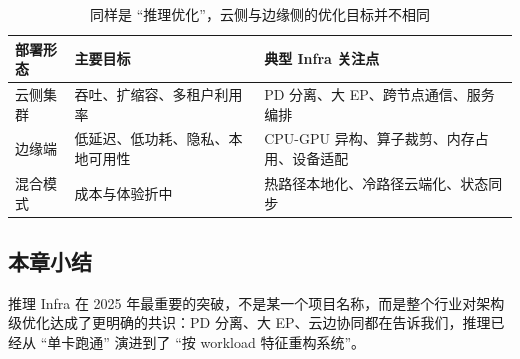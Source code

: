 \begin{table}[H]
\centering
\begin{tabular}{p{2.8cm}p{4.0cm}p{4.5cm}}
\toprule
\textbf{部署形态} & \textbf{主要目标} & \textbf{典型 Infra 关注点} \\
\midrule
云侧集群 & 吞吐、扩缩容、多租户利用率 & PD 分离、大 EP、跨节点通信、服务编排 \\
边缘端 & 低延迟、低功耗、隐私、本地可用性 & CPU-GPU 异构、算子裁剪、内存占用、设备适配 \\
混合模式 & 成本与体验折中 & 热路径本地化、冷路径云端化、状态同步 \\
\bottomrule
\end{tabular}
\caption{同样是 ``推理优化''，云侧与边缘侧的优化目标并不相同}
\end{table}

\subsection{本章小结}
推理 Infra 在 2025 年最重要的突破，不是某一个项目名称，而是整个行业对架构级优化达成了更明确的共识：PD 分离、大 EP、云边协同都在告诉我们，推理已经从 ``单卡跑通'' 演进到了 ``按 workload 特征重构系统''。

